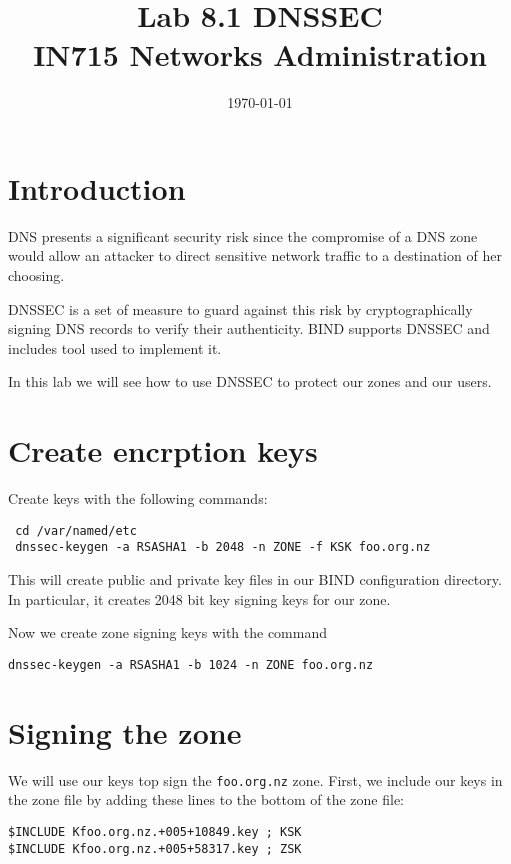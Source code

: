 \documentclass{article}
\begin{document}
\title{ Lab 8.1 DNSSEC\\ IN715 Networks Administration}
\date{\today}
\maketitle

\section*{Introduction}
DNS presents a significant security risk since the compromise of a DNS
zone would allow an attacker to direct sensitive network traffic to a
destination of her choosing.  

DNSSEC is a set of measure to guard against this risk by cryptographically 
signing DNS records to verify their authenticity.  BIND supports DNSSEC and includes tool used to implement it.

In this lab we will see how to use DNSSEC to protect our zones and our users.

\section{Create encrption keys}
Create keys with the following commands:

\begin{verbatim}
 cd /var/named/etc
 dnssec-keygen -a RSASHA1 -b 2048 -n ZONE -f KSK foo.org.nz
\end{verbatim}

This will create public and private key files in our BIND configuration directory.  In particular, it creates 2048 bit key signing keys for our zone.

Now we create zone signing keys with the command

\begin{verbatim}
dnssec-keygen -a RSASHA1 -b 1024 -n ZONE foo.org.nz
\end{verbatim}

\section{Signing the zone}
We will use our keys top sign the \texttt{foo.org.nz} zone.  First, we include our keys in the zone file by adding these lines to the bottom of the zone file:

\begin{verbatim}
$INCLUDE Kfoo.org.nz.+005+10849.key ; KSK
$INCLUDE Kfoo.org.nz.+005+58317.key ; ZSK
\end{verbatim}
\end{document}
